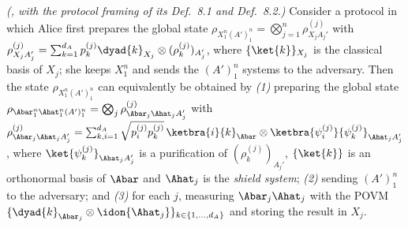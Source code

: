 
\begin{fact}\label{fact:sr}
\emph{(\cite[Lemma~8.3, Eqs.~(83)--(84)]{tupkary2026decoy}, with the
protocol framing of its Def.~8.1 and Def.~8.2.)}
Consider a protocol in which Alice first prepares the global state
$\rho_{X_1^n(A')_1^n}=\bigotimes_{j=1}^{n}\rho^{(j)}_{X_jA_j'}$ with
$\rho^{(j)}_{X_jA_j'}=\sum_{k=1}^{d_A}p^{(j)}_k\dyad{k}_{X_j}\otimes
(\rho^{(j)}_k)_{A_j'}$, where $\{\ket{k}\}_{X_j}$ is the classical basis of
$X_j$; she keeps $X_1^n$ and sends the $(A')_1^n$ systems to the adversary.
Then the state $\rho_{X_1^n(A')_1^n}$ can equivalently be obtained by
\emph{(1)} preparing the global state
$\rho_{\Abar_1^n\Ahat_1^n(A')_1^n}=\bigotimes_j\rho^{(j)}_{\Abar_j\Ahat_jA_j'}$
with
$\rho^{(j)}_{\Abar_j\Ahat_jA_j'}=\sum_{k,i=1}^{d_A}
\sqrt{p^{(j)}_ip^{(j)}_k}\,\ketbra{i}{k}_{\Abar}\otimes
\ketbra{\psi^{(j)}_i}{\psi^{(j)}_k}_{\Ahat_jA_j'}$, where
$\ket{\psi^{(j)}_k}_{\Ahat_jA_j'}$ is a purification of
$(\rho^{(j)}_k)_{A_j'}$, $\{\ket{k}\}$ is an orthonormal basis of $\Abar$
and $\Ahat_j$ is the \emph{shield system}; \emph{(2)} sending $(A')_1^n$ to
the adversary; and \emph{(3)} for each $j$, measuring $\Abar_j\Ahat_j$ with
the POVM $\{\dyad{k}_{\Abar_j}\otimes\idon{\Ahat_j}\}_{k\in\{1,\dots,d_A\}}$
and storing the result in $X_j$.


\end{fact}
